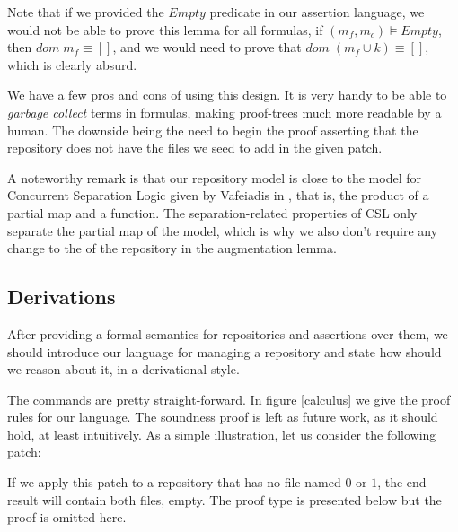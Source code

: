 \documentclass{llncs}
\newcommand{\F}[1]{\AgdaFunction{#1}}
\begin{document}
Note that if we provided the $Empty$ predicate in our assertion language, we
would not be able to prove this lemma for all formulas, if $(m_f , m_c) \vDash Empty$,
then $dom\; m_f \equiv []$, and we would need to prove that $dom\;(m_f \cup k) \equiv []$, which
is clearly absurd.

We have a few pros and cons of using this design. It is very handy to be able
to \emph{garbage collect} terms in formulas, making proof-trees much more readable by
a human. The downside being the need to begin the proof asserting that the repository
does not have the files we seed to add in the given patch.

A noteworthy remark is that our repository model is close to the model for Concurrent
Separation Logic given by Vafeiadis in \cite{Vafeiadis2011}, that is, the product
of a partial map and a function. The separation-related properties of CSL
only separate the partial map of the model, which is why we also don't require any change to
the \F{contents} of the repository in the augmentation lemma. 

\subsection{Derivations}

After providing a formal semantics for repositories and assertions over them, we should
introduce our language for managing a repository and state how should we reason about it,
in a derivational style.


The commands are pretty straight-forward. In figure \ref{calculus} we give the proof rules for our language. 
The soundness proof is left as future work, as it should hold, at least intuitively.
As a simple illustration, let us consider the following patch:


If we apply this patch to a repository that has no file named $0$ or $1$, the end result
will contain both files, empty. The proof type is presented below but the proof is omitted
here.


\newcommand{\prooflbl}[1]{\RightLabel{\scriptsize{(#1)}}}
\end{document}
